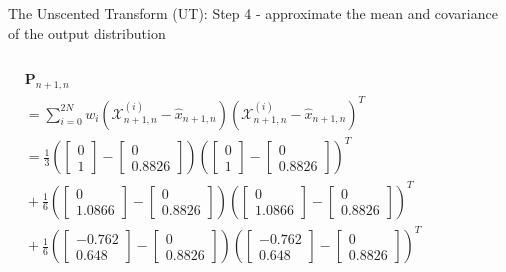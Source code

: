 \begin{frame}{The Unscented Transform (UT): Step 4 - approximate the mean and covariance of the output distribution}
\begin{columns}
\begin{align*}
& \mathbf{P}_{n+1,n}  \\ & = \sum_{i=0}^{2N} w_i \left( \mathcal{X}^{(i)}_{n+1,n} - \hat{x}_{n+1,n} \right) \left( \mathcal{X}^{(i)}_{n+1,n} - \hat{x}_{n+1,n} \right)^T \\
& = \frac{1}{3}
\left(
\begin{bmatrix}
0 \\
1
\end{bmatrix}
-
\begin{bmatrix}
0 \\
0.8826
\end{bmatrix}
\right)
\left(
\begin{bmatrix}
0 \\
1
\end{bmatrix}
-
\begin{bmatrix}
0 \\
0.8826
\end{bmatrix}
\right)^T \\
& \!+\! \frac{1}{6}\!
\left(
\begin{bmatrix}
0 \\
1.0866
\end{bmatrix}
\!-\!
\begin{bmatrix}
0 \\
0.8826
\end{bmatrix}
\right)\!\!
\left(\!
\begin{bmatrix}
0 \\
1.0866
\end{bmatrix}
\!-\!
\begin{bmatrix}
0 \\
0.8826
\end{bmatrix}\!
\right)^T \\
& \!+\! \frac{1}{6}\!
\left(\!
\begin{bmatrix}
-0.762 \\
0.648
\end{bmatrix}
\!-\!
\begin{bmatrix}
0 \\
0.8826
\end{bmatrix}
\right)\!\!
\left(\!
\begin{bmatrix}
-0.762 \\
0.648
\end{bmatrix}
\!-\!
\begin{bmatrix}
0 \\
0.8826
\end{bmatrix}\!
\right)^T \\

\end{align*}
\end{columns}
\end{frame}
